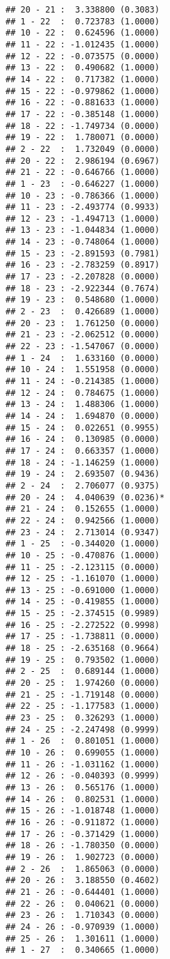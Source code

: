 \documentclass[12pt,]{article}
\begin{document}
\begin{verbatim}
## 20 - 21 :  3.338800 (0.3083)
## 1 - 22  :  0.723783 (1.0000)
## 10 - 22 :  0.624596 (1.0000)
## 11 - 22 : -1.012435 (1.0000)
## 12 - 22 : -0.073575 (0.0000)
## 13 - 22 :  0.490682 (1.0000)
## 14 - 22 :  0.717382 (1.0000)
## 15 - 22 : -0.979862 (1.0000)
## 16 - 22 : -0.881633 (1.0000)
## 17 - 22 : -0.385148 (1.0000)
## 18 - 22 : -1.749734 (0.0000)
## 19 - 22 :  1.780071 (0.0000)
## 2 - 22  :  1.732049 (0.0000)
## 20 - 22 :  2.986194 (0.6967)
## 21 - 22 : -0.646766 (1.0000)
## 1 - 23  : -0.646227 (1.0000)
## 10 - 23 : -0.786366 (1.0000)
## 11 - 23 : -2.493774 (0.9933)
## 12 - 23 : -1.494713 (1.0000)
## 13 - 23 : -1.044834 (1.0000)
## 14 - 23 : -0.748064 (1.0000)
## 15 - 23 : -2.891593 (0.7981)
## 16 - 23 : -2.783259 (0.8917)
## 17 - 23 : -2.207828 (0.0000)
## 18 - 23 : -2.922344 (0.7674)
## 19 - 23 :  0.548680 (1.0000)
## 2 - 23  :  0.426689 (1.0000)
## 20 - 23 :  1.761250 (0.0000)
## 21 - 23 : -2.062512 (0.0000)
## 22 - 23 : -1.547067 (0.0000)
## 1 - 24  :  1.633160 (0.0000)
## 10 - 24 :  1.551958 (0.0000)
## 11 - 24 : -0.214385 (1.0000)
## 12 - 24 :  0.784675 (1.0000)
## 13 - 24 :  1.488306 (1.0000)
## 14 - 24 :  1.694870 (0.0000)
## 15 - 24 :  0.022651 (0.9955)
## 16 - 24 :  0.130985 (0.0000)
## 17 - 24 :  0.663357 (1.0000)
## 18 - 24 : -1.146259 (1.0000)
## 19 - 24 :  2.693507 (0.9436)
## 2 - 24  :  2.706077 (0.9375)
## 20 - 24 :  4.040639 (0.0236)*
## 21 - 24 :  0.152655 (1.0000)
## 22 - 24 :  0.942566 (1.0000)
## 23 - 24 :  2.713014 (0.9347)
## 1 - 25  : -0.344020 (1.0000)
## 10 - 25 : -0.470876 (1.0000)
## 11 - 25 : -2.123115 (0.0000)
## 12 - 25 : -1.161070 (1.0000)
## 13 - 25 : -0.691000 (1.0000)
## 14 - 25 : -0.419855 (1.0000)
## 15 - 25 : -2.374515 (0.9989)
## 16 - 25 : -2.272522 (0.9998)
## 17 - 25 : -1.738811 (0.0000)
## 18 - 25 : -2.635168 (0.9664)
## 19 - 25 :  0.793502 (1.0000)
## 2 - 25  :  0.689144 (1.0000)
## 20 - 25 :  1.974260 (0.0000)
## 21 - 25 : -1.719148 (0.0000)
## 22 - 25 : -1.177583 (1.0000)
## 23 - 25 :  0.326293 (1.0000)
## 24 - 25 : -2.247498 (0.9999)
## 1 - 26  :  0.801051 (1.0000)
## 10 - 26 :  0.699055 (1.0000)
## 11 - 26 : -1.031162 (1.0000)
## 12 - 26 : -0.040393 (0.9999)
## 13 - 26 :  0.565176 (1.0000)
## 14 - 26 :  0.802531 (1.0000)
## 15 - 26 : -1.018748 (1.0000)
## 16 - 26 : -0.911872 (1.0000)
## 17 - 26 : -0.371429 (1.0000)
## 18 - 26 : -1.780350 (0.0000)
## 19 - 26 :  1.902723 (0.0000)
## 2 - 26  :  1.865063 (0.0000)
## 20 - 26 :  3.188550 (0.4602)
## 21 - 26 : -0.644401 (1.0000)
## 22 - 26 :  0.040621 (0.0000)
## 23 - 26 :  1.710343 (0.0000)
## 24 - 26 : -0.970939 (1.0000)
## 25 - 26 :  1.301611 (1.0000)
## 1 - 27  :  0.340665 (1.0000)

\end{verbatim}
\end{document}
